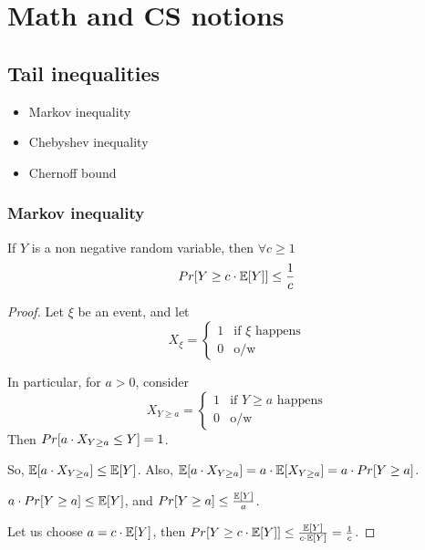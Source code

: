 \section{Math and CS notions}\label{sec:math_notions}

\subsection{Tail inequalities}
    \begin{itemize}
        \item Markov inequality
        \item Chebyshev inequality
        \item Chernoff bound
    \end{itemize}

    \subsubsection{Markov inequality}\label{subsec:markov_ineq}
        If $Y$ is a non negative random variable, then $\forall c \geq 1$
        \[ Pr[Y \geq c \cdot \mathbb{E}[Y]] \leq \frac{1}{c} \]

    \begin{proof}
        Let $\xi$ be an event, and let
        \begin{equation}
            X_\xi = 
            \begin{cases}
                1 & \text{if } \xi \text{ happens}\\
                0 & \text{o/w}
            \end{cases}
        \end{equation}

        In particular, for $a > 0$, consider
        \begin{equation}
            X_{Y \geq a} = 
            \begin{cases}
                1 & \text{if } Y \geq a \text{ happens}\\
                0 & \text{o/w}
            \end{cases}
        \end{equation}
        Then $Pr[a \cdot X_{Y \geq a} \leq Y] = 1$.

        So, $\mathbb{E}[a \cdot X_{Y \geq a}] \leq \mathbb{E}[Y]$.
        Also, $\mathbb{E}[a \cdot X_{Y \geq a}] = a \cdot \mathbb{E}[X_{Y \geq a}] = a \cdot Pr[Y \geq a]$.

        $a \cdot Pr[Y \geq a] \leq \mathbb{E}[Y]$, and $Pr[Y \geq a] \leq \frac{\mathbb{E}[Y]}{a}$.

        Let us choose $a = c \cdot \mathbb{E}[Y]$, then $Pr[Y \geq c \cdot \mathbb{E}[Y]] \leq \frac{\mathbb{E}[Y]}{c \cdot \mathbb{E}[Y]} = \frac{1}{c}$.
    \end{proof}


